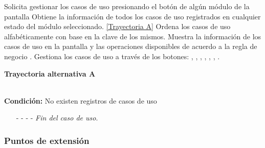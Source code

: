 \begin{UCtrayectoria}
	\UCpaso[\UCactor] Solicita gestionar los casos de uso presionando el botón \UCsist de algún módulo de la pantalla 
	\UCpaso[\UCsist] Obtiene la información de todos los casos de uso registrados en cualquier estado del módulo seleccionado. \hyperlink{CU12:TAA}{[Trayectoria A]}
	\UCpaso[\UCsist] Ordena los casos de uso alfabéticamente con base en la clave de los mismos.
	\UCpaso[\UCsist] Muestra la información de los casos de uso en la pantalla  y las operaciones disponibles de acuerdo a la regla de negocio .\label{CU12-P4}
	\UCpaso[\UCactor] Gestiona los casos de uso a través de los botones: , , \editar, , ,  , \eliminar . 
\end{UCtrayectoria}		
\hypertarget{CU12:TAA}{\textbf{Trayectoria alternativa A}}\\
\noindent \textbf{Condición:} No existen registros de casos de uso
\begin{enumerate}
	\UCpaso[\UCsist] Muestra el mensaje  en la pantalla  para indicar que no hay registros de casos de uso para mostrar. \label{CU12-TA1}
	\UCpaso[\UCactor] Gestiona los casos de uso a través del botón: . 
	\item[- -] - - {\em {Fin del caso de uso}}.%
\end{enumerate}

\subsubsection{Puntos de extensión}

